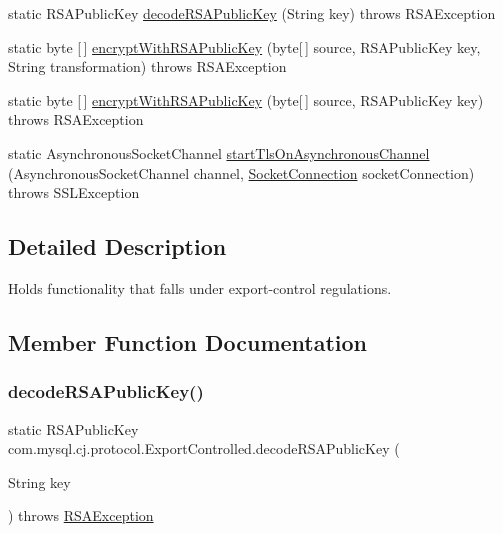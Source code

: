 \begin{DoxyCompactItemize}
\item 
static R\+S\+A\+Public\+Key \mbox{\hyperlink{classcom_1_1mysql_1_1cj_1_1protocol_1_1_export_controlled_a909eca9940fffbea1168d1f27c6794da}{decode\+R\+S\+A\+Public\+Key}} (String key)  throws R\+S\+A\+Exception 
\item 
static byte \mbox{[}$\,$\mbox{]} \mbox{\hyperlink{classcom_1_1mysql_1_1cj_1_1protocol_1_1_export_controlled_aa9026bc31e213be6337010026aa89632}{encrypt\+With\+R\+S\+A\+Public\+Key}} (byte\mbox{[}$\,$\mbox{]} source, R\+S\+A\+Public\+Key key, String transformation)  throws R\+S\+A\+Exception 
\item 
static byte \mbox{[}$\,$\mbox{]} \mbox{\hyperlink{classcom_1_1mysql_1_1cj_1_1protocol_1_1_export_controlled_a8a20678c3f99068fe3230c7e60efcf29}{encrypt\+With\+R\+S\+A\+Public\+Key}} (byte\mbox{[}$\,$\mbox{]} source, R\+S\+A\+Public\+Key key)  throws R\+S\+A\+Exception 
\item 
static Asynchronous\+Socket\+Channel \mbox{\hyperlink{classcom_1_1mysql_1_1cj_1_1protocol_1_1_export_controlled_a0737e8a1422c8d2e5fa6fb9e4dd61caa}{start\+Tls\+On\+Asynchronous\+Channel}} (Asynchronous\+Socket\+Channel channel, \mbox{\hyperlink{interfacecom_1_1mysql_1_1cj_1_1protocol_1_1_socket_connection}{Socket\+Connection}} socket\+Connection)  throws S\+S\+L\+Exception 
\end{DoxyCompactItemize}


\subsection{Detailed Description}
Holds functionality that falls under export-\/control regulations. 

\subsection{Member Function Documentation}
\mbox{\label{classcom_1_1mysql_1_1cj_1_1protocol_1_1_export_controlled_a909eca9940fffbea1168d1f27c6794da}} 
\subsubsection{\texorpdfstring{decode\+R\+S\+A\+Public\+Key()}{decodeRSAPublicKey()}}
{\footnotesize\ttfamily static R\+S\+A\+Public\+Key com.\+mysql.\+cj.\+protocol.\+Export\+Controlled.\+decode\+R\+S\+A\+Public\+Key (\begin{DoxyParamCaption}\item[{String}]{key }\end{DoxyParamCaption}) throws \mbox{\hyperlink{classcom_1_1mysql_1_1cj_1_1exceptions_1_1_r_s_a_exception}{R\+S\+A\+Exception}}\hspace{0.3cm}{\ttfamily [static]}}

